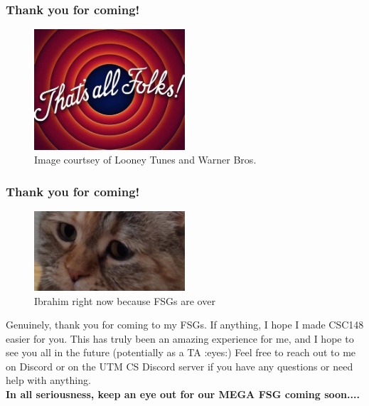 \documentclass[hyperref={colorlinks,citecolor=blue,linkcolor=blue,urlcolor=blue}, aspectratio=1610]{beamer}
\begin{document}
\begin{frame}
  \frametitle{Thank you for coming!}
  \centering
  \begin{figure}
    \includegraphics[width=0.5\textwidth]{that's_all_folks.jpeg}
    \caption{Image courtsey of Looney Tunes\texttrademark{} and Warner Bros.\texttrademark{}}
  \end{figure}
\end{frame}

\begin{frame}
  \frametitle{Thank you for coming!}
  \centering
  \begin{figure}
    \includegraphics[width=0.5\textwidth]{sadcatcover.jpg}
    \caption{Ibrahim right now because FSGs are over}
  \end{figure}
  Genuinely, thank you for coming to my FSGs. If anything, I hope I made CSC148 easier for you. This has truly been an amazing experience for me, and I hope to see you all in the future (potentially as a TA :eyes:)
  Feel free to reach out to me on Discord or on the UTM CS Discord server if you have any questions or need help with anything.\\

  \textbf{In all seriousness, keep an eye out for our MEGA FSG coming soon....}
\end{frame}
\end{document}
